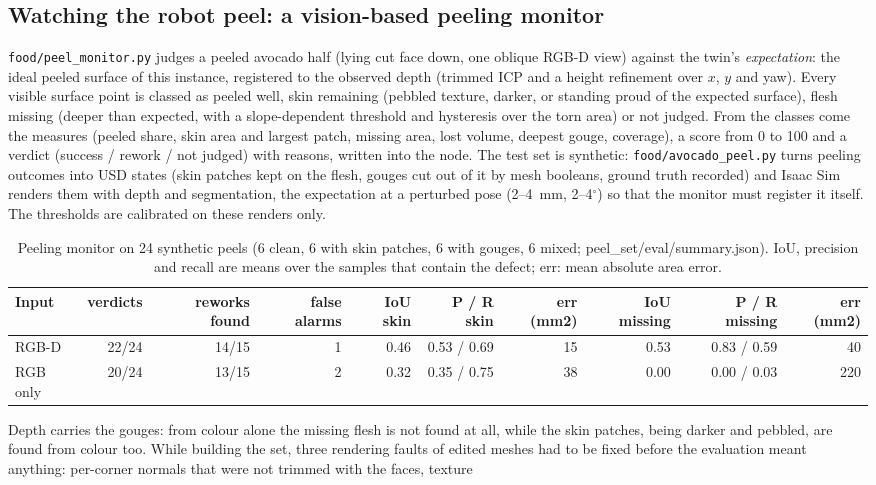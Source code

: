 \documentclass[10.5pt,a4paper]{article}
\begin{document}
\subsection{Watching the robot peel: a vision-based peeling monitor}
\texttt{food/peel\_monitor.py} judges a peeled avocado half (lying cut face down, one oblique RGB-D view) against the
twin's \emph{expectation}: the ideal peeled surface of this instance, registered to the observed depth (trimmed ICP
and a height refinement over $x$, $y$ and yaw). Every visible surface point is classed as peeled well, skin remaining
(pebbled texture, darker, or standing proud of the expected surface), flesh missing (deeper than expected, with a
slope-dependent threshold and hysteresis over the torn area) or not judged. From the classes come the measures
(peeled share, skin area and largest patch, missing area, lost volume, deepest gouge, coverage), a score from 0 to
100 and a verdict (success / rework / not judged) with reasons, written into the node. The test set is synthetic:
\texttt{food/avocado\_peel.py} turns peeling outcomes into USD states (skin patches kept on the flesh, gouges cut out
of it by mesh booleans, ground truth recorded) and Isaac Sim renders them with depth and segmentation, the
expectation at a perturbed pose (2--4~mm, 2--4$^\circ$) so that the monitor must register it itself. The thresholds
are calibrated on these renders only.
\begin{table}[htbp]\centering\scriptsize\caption{Peeling monitor on 24 synthetic peels (6 clean, 6 with skin patches, 6 with gouges, 6 mixed; peel\_set/eval/summary.json). IoU, precision and recall are means over the samples that contain the defect; err: mean absolute area error.}
\begin{tabularx}{\linewidth}{@{}lrrrrrrrrr@{}}\toprule Input & verdicts & reworks found & false alarms & IoU skin & P / R skin & err (mm2) & IoU missing & P / R missing & err (mm2) \\\midrule
RGB-D & 22/24 & 14/15 & 1 & 0.46 & 0.53 / 0.69 & 15 & 0.53 & 0.83 / 0.59 & 40 \\
RGB only & 20/24 & 13/15 & 2 & 0.32 & 0.35 / 0.75 & 38 & 0.00 & 0.00 / 0.03 & 220 \\\bottomrule\end{tabularx}\end{table}
Depth carries the gouges: from colour alone the missing flesh is not found at all, while the skin patches,
being darker and pebbled, are found from colour too. While building the set, three rendering faults of edited meshes
had to be fixed before the evaluation meant anything: per-corner normals that were not trimmed with the faces, texture
\end{document}
